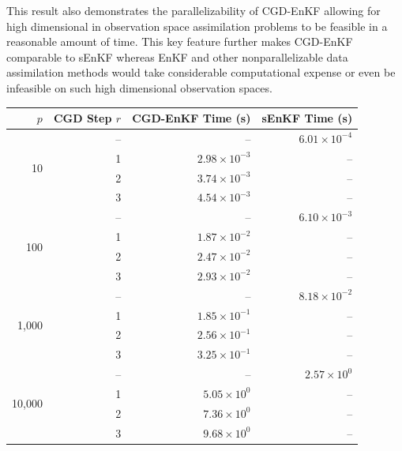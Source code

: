 \documentclass[11p]{elsarticle}
\numberwithin{equation}{section}
\begin{document}
This result also demonstrates the parallelizability of CGD-EnKF allowing for high dimensional in observation space assimilation problems to be feasible in a reasonable amount of time.  This key feature further makes CGD-EnKF comparable to sEnKF whereas EnKF and other nonparallelizable data assimilation methods would take considerable computational expense or even be infeasible on such high dimensional observation spaces.



\begin{table}[ht]                                                   
  \centering                                                                     
  \small                                                                           
  \begin{tabular}{r r r r}                                                         
  \toprule                                                  
  $p$ & CGD Step $r$ & CGD-EnKF Time (s)  & sEnKF Time (s)  \\
  \midrule

  \multirow{4}{*}{10}
    & -- & --                      & $6.01\times10^{-4}$ \\
    & 1  & $2.98\times10^{-3}$     & -- \\
    & 2  & $3.74\times10^{-3}$     & -- \\
    & 3  & $4.54\times10^{-3}$     & -- \\
  \midrule

  \multirow{4}{*}{100}
    & -- & --                      & $6.10\times10^{-3}$ \\
    & 1  & $1.87\times10^{-2}$     & -- \\
    & 2  & $2.47\times10^{-2}$     & -- \\
    & 3  & $2.93\times10^{-2}$     & -- \\
  \midrule

  \multirow{4}{*}{1{,}000}
    & -- & --                      & $8.18\times10^{-2}$ \\
    & 1  & $1.85\times10^{-1}$     & -- \\
    & 2  & $2.56\times10^{-1}$     & -- \\
    & 3  & $3.25\times10^{-1}$     & -- \\
  \midrule

  \multirow{4}{*}{10{,}000}
    & -- & --                      & $2.57\times10^{0}$ \\
    & 1  & $5.05\times10^{0}$      & -- \\
    & 2  & $7.36\times10^{0}$      & -- \\
    & 3  & $9.68\times10^{0}$      & -- \\
  \midrule


\end{tabular}
\end{table}
\end{document}
